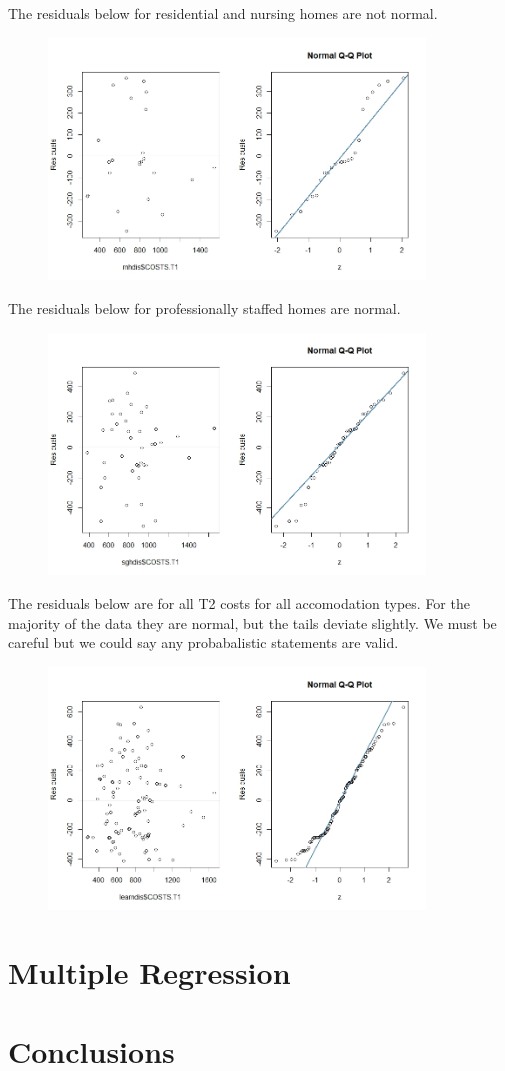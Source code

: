 \documentclass[]{article}
\begin{document}
The residuals below for residential and nursing homes are not normal.
\begin{figure}[H]
\centering
\includegraphics[width=10cm]{RStudio/jpeg/Res_RNH.jpeg}
\end{figure}
The residuals below for professionally staffed homes are normal.
\begin{figure}[H]
\centering
\includegraphics[width=10cm]{RStudio/jpeg/Res_SGH.jpeg}
\end{figure}
The residuals below are for all T2 costs for all accomodation types. For the majority of the data they are normal, but the tails deviate slightly. We must be careful but we could say any probabalistic statements are valid.
\begin{figure}[H]
\centering
\includegraphics[width=10cm]{RStudio/jpeg/Res_COST.jpeg}
\end{figure}

\section{Multiple Regression}

\section{Conclusions}
\end{document}
